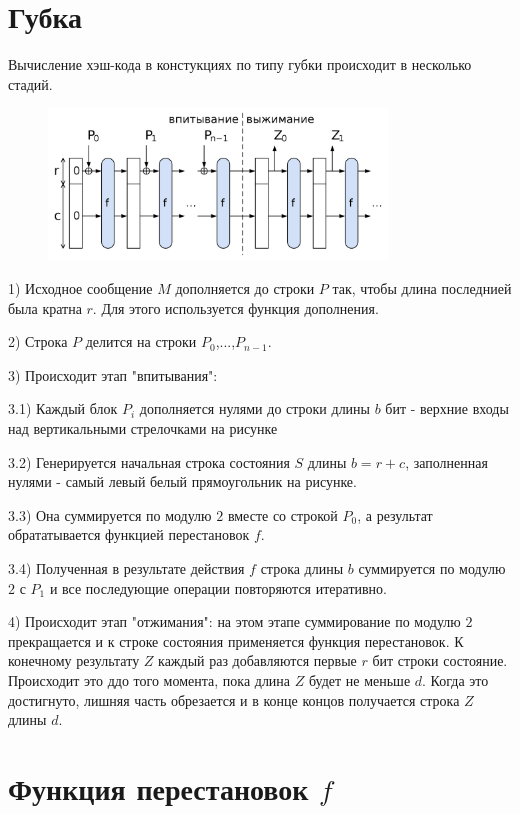 \documentclass[a4paper,12pt]{article}
\theoremstyle{plain} %
\theoremstyle{definition} %
\theoremstyle{remark} %
\begin{document}
	\section{Губка} 
	
	Вычисление хэш-кода в констукциях по типу губки происходит в несколько стадий.
	
	\begin{figure}[h!]
		\centering
		\includegraphics[width=90mm]{2.png}
	\end{figure}

	1) Исходное сообщение $M$ дополняется до строки $P$ так, чтобы длина последнией была кратна $r$. Для этого используется функция дополнения.
	
	2) Строка $P$ делится на строки $P_0$,...,$P_{n-1}$.
	
	3) Происходит этап "впитывания":
	
	3.1) Каждый блок $P_i$ дополняется нулями до строки длины $b$ бит - верхние входы над вертикальными стрелочками на рисунке
	
	3.2) Генерируется начальная строка состояния $S$ длины $b=r+c$, заполненная нулями - самый левый белый прямоугольник на рисунке. 
	
	3.3) Она суммируется по модулю $2$ вместе со строкой $P_0$, а результат обрататывается функцией перестановок $f$.
	
	3.4) Полученная в результате действия $f$ строка длины $b$ суммируется по модулю $2$ с $P_1$ и все последующие операции повторяются итеративно. 
	
	4) Происходит этап "отжимания": на этом этапе суммирование по модулю $2$ прекращается и к строке состояния применяется функция перестановок. К конечному результату $Z$ каждый раз добавляются первые $r$ бит строки состояние. Происходит это ддо того момента, пока длина $Z$ будет не меньше $d$. Когда это достигнуто, лишняя часть обрезается и в конце концов получается строка $Z$ длины $d$.
	
	
	\newpage
	
	\section{Функция перестановок $f$}
	
\end{document}
